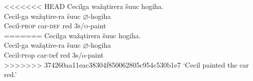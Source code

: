 \documentclass[output=paper]{LSP/langsci}
\begin{document}
\begin{exe}
\begin{exe}
\begin{exe}
\begin{exe}
{\begin{exe}
\begin{exe}
\ex
\begin{xlist}

<<<<<<< HEAD
\ex \glll Cecilga wažątirera šuuc hogiha. \\
Cecil-ga  wažątire-ra šuuc {$\varnothing$}-hogiha \\
Cecil-\textsc{prop} car-\textsc{def} red \textsc{3s/o}-paint\\
=======
\ex \glll Cecilga wa\v{z}\k{a}tirera \v{s}uuc hogiha. \\
Cecil-ga  wa\v{z}\k{a}tire-ra \v{s}uuc $\varnothing$-hogiha \\
Cecil-{\textsc prop} car-{\textsc def} red {\textsc 3s/o}-paint\\
>>>>>>> 374260aa11eac38304f850062805c954c530b1e7
\glt `Cecil painted the car red.'

\ex 
{\hspace{1em}}\newline
{}
\end{xlist}
\end{exe}


\end{exe}}
\end{exe}
\end{exe}
\end{exe}
\end{exe}
\end{document}

